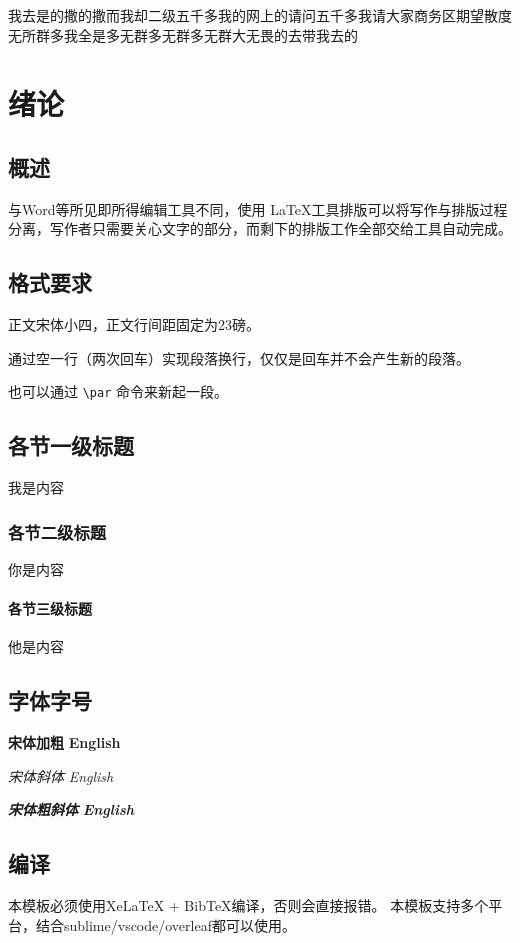 \begin{introduction}
	我去是的撒的撒而我却二级五千多我的网上的请问五千多我请大家商务区期望散度无所群多我全是多无群多无群多无群大无畏的去带我去的 
\end{introduction}
\chapter{绪论}

\section{概述}

与Word等所见即所得编辑工具不同，使用 \LaTeX 工具排版可以将写作与排版过程分离，写作者只需要关心文字的部分，而剩下的排版工作全部交给工具自动完成。

\section{格式要求}
正文宋体小四，正文行间距固定为23磅。

通过空一行（两次回车）实现段落换行，仅仅是回车并不会产生新的段落。 \par

也可以通过 \verb|\par| 命令来新起一段。

\section{各节一级标题}
我是内容

\subsection{各节二级标题}
你是内容

\subsubsection{各节三级标题}
他是内容

\section{字体字号}
{\songti \bfseries 宋体加粗} {\textbf{English}}

{\songti \itshape 宋体斜体} {\textit{English}}

{\songti \bfseries \itshape 宋体粗斜体} {\textbf{\textit{English}}}

\section{编译}
本模板必须使用XeLaTeX + BibTeX编译，否则会直接报错。 本模板支持多个平台，结合sublime/vscode/overleaf都可以使用。